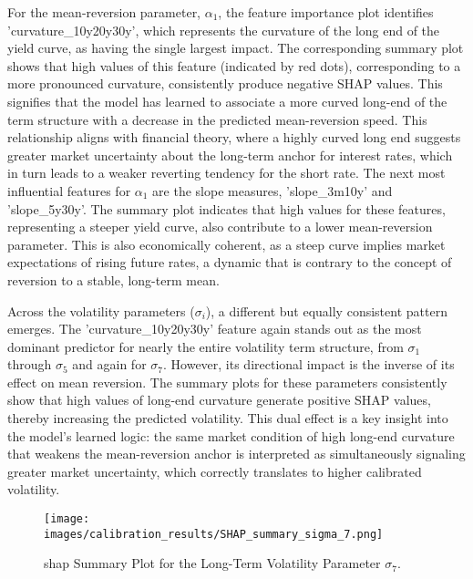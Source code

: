 For the mean-reversion parameter, $\alpha_1$, the feature importance plot identifies 'curvature\_10y20y30y', which represents the curvature of the long end of the yield curve, as having the single largest impact. The corresponding summary plot shows that high values of this feature (indicated by red dots), corresponding to a more pronounced curvature, consistently produce negative SHAP values. This signifies that the model has learned to associate a more curved long-end of the term structure with a decrease in the predicted mean-reversion speed. This relationship aligns with financial theory, where a highly curved long end suggests greater market uncertainty about the long-term anchor for interest rates, which in turn leads to a weaker reverting tendency for the short rate. The next most influential features for $\alpha_1$ are the slope measures, 'slope\_3m10y' and 'slope\_5y30y'. The summary plot indicates that high values for these features, representing a steeper yield curve, also contribute to a lower mean-reversion parameter. This is also economically coherent, as a steep curve implies market expectations of rising future rates, a dynamic that is contrary to the concept of reversion to a stable, long-term mean.

Across the volatility parameters ($\sigma_i$), a different but equally consistent pattern emerges. The 'curvature\_10y20y30y' feature again stands out as the most dominant predictor for nearly the entire volatility term structure, from $\sigma_1$ through $\sigma_5$ and again for $\sigma_7$. However, its directional impact is the inverse of its effect on mean reversion. The summary plots for these parameters consistently show that high values of long-end curvature generate positive SHAP values, thereby increasing the predicted volatility. This dual effect is a key insight into the model's learned logic: the same market condition of high long-end curvature that weakens the mean-reversion anchor is interpreted as simultaneously signaling greater market uncertainty, which correctly translates to higher calibrated volatility.

\begin{figure}[H]
	\centering
	\texttt{[image: images/calibration\_results/SHAP\_summary\_sigma\_7.png]}
	\caption{\ac{shap} Summary Plot for the Long-Term Volatility Parameter \(\sigma_7\).}
	\label{fig:shap_summary_sigma_7}
\end{figure}

